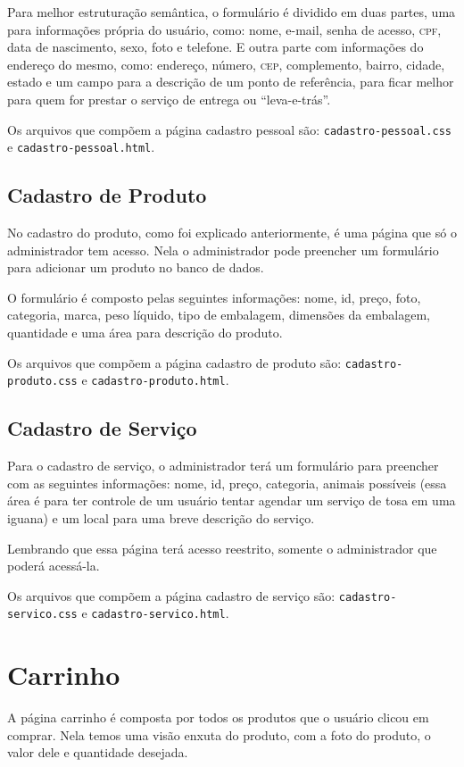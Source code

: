 Para melhor estruturação semântica, o formulário é dividido em duas partes, uma para
informações própria do usuário, como: nome, e-mail, senha de acesso, \textsc{cpf},
data de nascimento, sexo, foto e telefone. E outra parte com informações do endereço
do mesmo, como: endereço, número, \textsc{cep}, complemento, bairro, cidade, estado
e um campo para a descrição de um ponto de referência, para ficar melhor para quem for
prestar o serviço de entrega ou “leva-e-trás”.

Os arquivos que compõem a página cadastro pessoal são: \texttt{cadastro-pessoal.css} e
\texttt{cadastro-pessoal.html}.

\subsection{Cadastro de Produto}
No cadastro do produto, como foi explicado anteriormente, é uma página que só o administrador
tem acesso. Nela o administrador pode preencher um formulário para adicionar um produto no
banco de dados.

O formulário é composto pelas seguintes informações: nome, id, preço, foto, categoria, marca,
peso líquido, tipo de embalagem, dimensões da embalagem, quantidade e uma área para descrição
do produto.

Os arquivos que compõem a página cadastro de produto são: \texttt{cadastro-produto.css} e
\texttt{cadastro-produto.html}.

\subsection{Cadastro de Serviço}
Para o cadastro de serviço, o administrador terá um formulário para preencher com as seguintes
informações: nome, id, preço, categoria, animais possíveis (essa área é para ter controle de um
usuário tentar agendar um serviço de tosa em uma iguana) e um local para uma breve descrição
do serviço.

Lembrando que essa página terá acesso reestrito, somente o administrador que poderá acessá-la.

Os arquivos que compõem a página cadastro de serviço são: \texttt{cadastro-servico.css} e
\texttt{cadastro-servico.html}.

\section{Carrinho}
A página carrinho é composta por todos os produtos que o usuário clicou em comprar. Nela temos
uma visão enxuta do produto, com a foto do produto, o valor dele e quantidade desejada.

